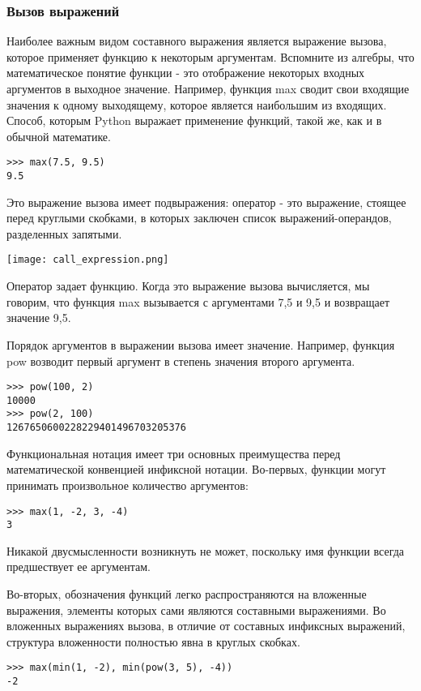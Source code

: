 \subsubsection{Вызов выражений}
Наиболее важным видом составного выражения является выражение вызова, которое применяет функцию к некоторым аргументам. Вспомните из алгебры, что математическое понятие функции - это отображение некоторых входных аргументов в выходное значение. Например, функция max сводит свои входящие значения к одному выходящему, которое является наибольшим из входящих. Способ, которым Python выражает применение функций, такой же, как и в обычной математике.
\begin{verbatim}
>>> max(7.5, 9.5)
9.5
  \end{verbatim}

Это выражение вызова имеет подвыражения: оператор - это выражение, стоящее перед круглыми скобками, в которых заключен список выражений-операндов, разделенных запятыми.
\begin{center}
  \texttt{[image: call\_expression.png]}
\end{center}

Оператор задает функцию. Когда это выражение вызова вычисляется, мы говорим, что функция max вызывается с аргументами 7,5 и 9,5 и возвращает значение 9,5.

Порядок аргументов в выражении вызова имеет значение. Например, функция pow возводит первый аргумент в степень значения второго аргумента.
\begin{verbatim}
>>> pow(100, 2)
10000
>>> pow(2, 100)
1267650600228229401496703205376
  \end{verbatim}

Функциональная нотация имеет три основных преимущества перед математической конвенцией инфиксной нотации. Во-первых, функции могут принимать произвольное количество аргументов:
\begin{verbatim}
>>> max(1, -2, 3, -4)
3
  \end{verbatim}

Никакой двусмысленности возникнуть не может, поскольку имя функции всегда предшествует ее аргументам.

Во-вторых, обозначения функций легко распространяются на вложенные выражения, элементы которых сами являются составными выражениями. Во вложенных выражениях вызова, в отличие от составных инфиксных выражений, структура вложенности полностью явна в круглых скобках.
\begin{verbatim}
>>> max(min(1, -2), min(pow(3, 5), -4))
-2
  \end{verbatim}

